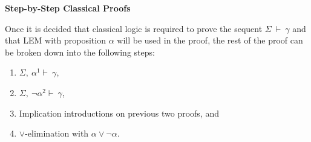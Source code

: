 \documentclass{book}
\begin{document}
    \begin{mdframed}
        {\bf Step-by-Step Classical Proofs}
        
        Once it is decided that classical logic is required to prove the sequent $\Sigma \ \vdash \ \gamma$ and that LEM with proposition $\alpha$ will be used in the proof, the rest of the proof can be broken down into the following steps: 

            \begin{enumerate}
                \item $\Sigma, \ \alpha^{1} \vdash \ \gamma$,
                \item $\Sigma, \ \lnot\alpha^{2} \vdash \ \gamma$,
                \item Implication introductions on previous two proofs, and
                \item $\lor$-elimination with $\alpha \lor \lnot \alpha$. 
            \end{enumerate}
        
    \end{mdframed}
    
\end{document}
